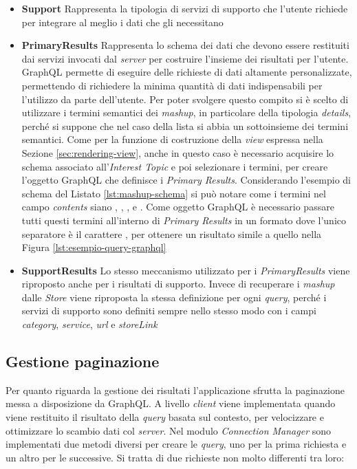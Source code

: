 \begin{itemize}
	\item \textbf{Support}
	Rappresenta la tipologia di servizi di supporto che l'utente richiede per integrare al meglio i dati che gli necessitano %
	\item \textbf{PrimaryResults}
	Rappresenta lo schema dei dati che devono essere restituiti dai servizi invocati dal \emph{server} per costruire l'insieme dei risultati per l'utente. GraphQL permette di eseguire delle richieste di dati altamente personalizzate, permettendo di richiedere la minima quantità di dati indispensabili per l'utilizzo da parte dell'utente. Per poter svolgere questo compito si è scelto di utilizzare i termini semantici dei \emph{mashup}, in particolare della tipologia \emph{details}, perché si suppone che nel caso della lista si abbia un sottoinsieme dei termini semantici. Come per la funzione di costruzione della \emph{view} espressa nella Sezione \ref{sec:rendering-view}, anche in questo caso è necessario acquisire lo schema associato all'\emph{Interest Topic} e poi selezionare i termini, per creare l'oggetto GraphQL che definisce i \emph{Primary Results}. Considerando l'esempio di schema del Listato \ref{lst:mashup-schema} si può notare come i termini nel campo \emph{contents} siano , , ,  e . Come oggetto GraphQL è necessario passare tutti questi termini all'interno di \emph{Primary Results} in un formato dove l'unico separatore è il carattere , per ottenere un risultato simile a quello nella Figura \ref{lst:esempio-query-graphql} 
	\item \textbf{SupportResults}
	Lo stesso meccanismo utilizzato per i \emph{PrimaryResults} viene riproposto anche per i risultati di supporto. Invece di recuperare i \emph{mashup} dalle \emph{Store} viene riproposta la stessa definizione per ogni \emph{query}, perché i servizi di supporto sono definiti sempre nello stesso modo con i campi \emph{category}, \emph{service}, \emph{url} e \emph{storeLink}
\end{itemize}

\subsection{Gestione paginazione}\label{sec:paginazione-app}

Per quanto riguarda la gestione dei risultati l'applicazione sfrutta la paginazione messa a disposizione da GraphQL. A livello \emph{client} viene implementata quando viene restituito il risultato della \emph{query} basata sul contesto, per velocizzare e ottimizzare lo scambio dati col \emph{server}. Nel modulo \emph{Connection Manager} sono implementati due metodi diversi per creare le \emph{query}, uno per la prima richiesta e un altro per le successive. Si tratta di due richieste non molto differenti tra loro:

